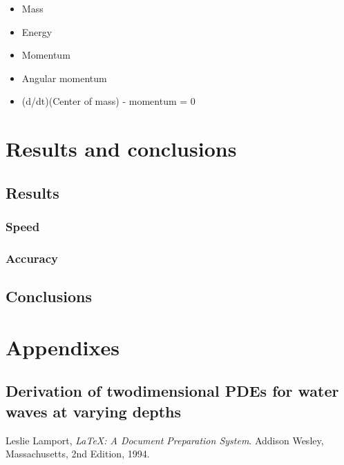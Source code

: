 \documentclass[a4paper]{report}
\begin{document}
\begin{itemize}
    \item Mass
    \item Energy
    \item Momentum
    \item Angular momentum
    \item (d/dt)(Center of mass) - momentum = 0
\end{itemize}


\part{Results and conclusions}

\chapter{Results}

\section{Speed}

\section{Accuracy}

\chapter{Conclusions}


\part{Appendixes}

\appendix
\chapter{Derivation of twodimensional PDEs for water waves at varying depths}


\iffalse




\else

\begin{thebibliography}{99}
    
    Leslie Lamport,
    \emph{\LaTeX: A Document Preparation System}.
    Addison Wesley, Massachusetts,
    2nd Edition,
    1994.
    
\end{thebibliography}

\fi
\end{document}
